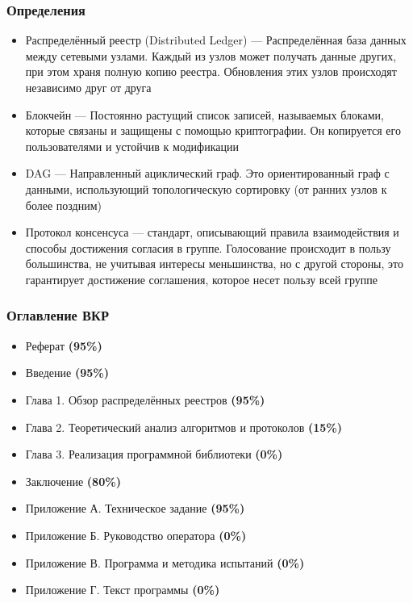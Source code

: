 \documentclass{beamer}
\begin{document}
\begin{frame}
\frametitle{Определения}
        \begin{itemize}
\small
    \item Распределённый реестр (Distributed Ledger) --- Распределённая база
        данных между сетевыми узлами. Каждый из узлов может получать данные
                других, при этом храня полную копию реестра.  Обновления этих
                узлов происходят независимо друг от друга

    \item Блокчейн --- Постоянно растущий список записей, называемых блоками,
        которые связаны и защищены с помощью криптографии. Он копируется его
                пользователями и устойчив к модификации

    \item DAG --- Направленный ациклический граф. Это ориентированный граф с
        данными, использующий топологическую сортировку (от ранних узлов к
                более поздним)
    \item Протокол консенсуса --- стандарт, описывающий правила взаимодействия
        и способы достижения согласия в группе. Голосование происходит в пользу
                большинства, не учитывая интересы меньшинства, но с другой
                стороны, это гарантирует достижение соглашения, которое несет
                пользу всей группе
        \end{itemize}
\end{frame}

\begin{frame}
\frametitle{Оглавление ВКР}
    \begin{itemize}
\small
        \item Реферат {\bfseries \color{green!75!blue}(95\%)}
        \item Введение {\bfseries \color{green!75!blue}(95\%)}
        \item Глава 1. Обзор распределённых реестров {\bfseries \color{green!75!blue}(95\%)}
        \item Глава 2. Теоретический анализ алгоритмов и протоколов {\bfseries \color{yellow!75!green}(15\%)}
        \item Глава 3. Реализация программной библиотеки {\bfseries \color{red!75!blue}(0\%)}
        \item Заключение {\bfseries \color{green!75!blue}(80\%)}
        \item Приложение А. Техническое задание {\bfseries \color{green!75!blue}(95\%)}
        \item Приложение Б. Руководство оператора  {\bfseries \color{red!75!blue}(0\%)}
        \item Приложение В. Программа и методика испытаний {\bfseries \color{red!75!blue}(0\%)}
        \item Приложение Г. Текст программы {\bfseries \color{red!75!blue}(0\%)}
    \end{itemize}
\end{frame}
\end{document}
